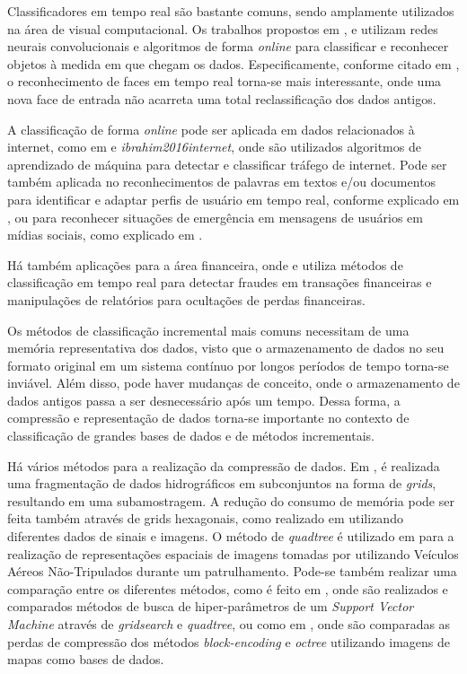 \documentclass[conference]{IEEEtran}
\begin{document}
Classificadores em tempo real são bastante comuns, sendo amplamente utilizados na área de visual computacional. Os trabalhos propostos em \cite{castro2018end}, \cite{shrivastava2016training} e \cite{hong2015online} utilizam redes neurais convolucionais e algoritmos de forma \textit{online} para classificar e reconhecer objetos à medida em que chegam os dados. Especificamente, conforme citado em \cite{castro2018end}, o reconhecimento de faces em tempo real torna-se mais interessante, onde uma nova face de entrada não acarreta uma total reclassificação dos dados antigos.

A classificação de forma \textit{online} pode ser aplicada em dados relacionados à internet, como em \cite{mohammed2009near} e \textit{ibrahim2016internet}, onde são utilizados algoritmos de aprendizado de máquina para detectar e classificar tráfego de internet. Pode ser também aplicada no reconhecimentos de palavras em textos e/ou documentos para identificar e adaptar perfis de usuário em tempo real, conforme explicado em \cite{bouchachia2014online}, ou para reconhecer situações de emergência em mensagens de usuários em mídias sociais, como explicado em \cite{yin2015using}.

Há também aplicações para a área financeira, onde \cite{cao2019titant} e \cite{patel2019application} utiliza métodos de classificação em tempo real para detectar fraudes em transações financeiras e manipulações de relatórios para ocultações de perdas financeiras.

Os métodos de classificação incremental mais comuns necessitam de uma memória representativa dos dados, visto que o armazenamento de dados no seu formato original em um sistema contínuo por longos períodos de tempo torna-se inviável. Além disso, pode haver mudanças de conceito, onde o armazenamento de dados antigos passa a ser desnecessário após um tempo. Dessa forma, a compressão e representação de dados torna-se importante no contexto de classificação de grandes bases de dados e de métodos incrementais.

Há vários métodos para a realização da compressão de dados. Em \cite{wlodarczyk2017fragmentation}, é realizada uma fragmentação de dados hidrográficos em subconjuntos na forma de \textit{grids}, resultando em uma subamostragem. A redução do consumo de memória pode ser feita também através de grids hexagonais, como realizado em \cite{knaup2007ct} utilizando diferentes dados de sinais e imagens. O método de \textit{quadtree} é utilizado em \cite{basilico2012online} para a realização de representações espaciais de imagens tomadas por utilizando Veículos Aéreos Não-Tripulados durante um patrulhamento. Pode-se também realizar uma comparação entre os diferentes métodos, como é feito em \cite{beltrami2015grid}, onde são realizados e comparados métodos de busca de hiper-parâmetros de um \textit{Support Vector Machine} através de \textit{gridsearch} e \textit{quadtree}, ou como em \cite{wai2018comparison}, onde são comparadas as perdas de compressão dos métodos \textit{block-encoding} e \textit{octree} utilizando imagens de mapas como bases de dados.
\end{document}
